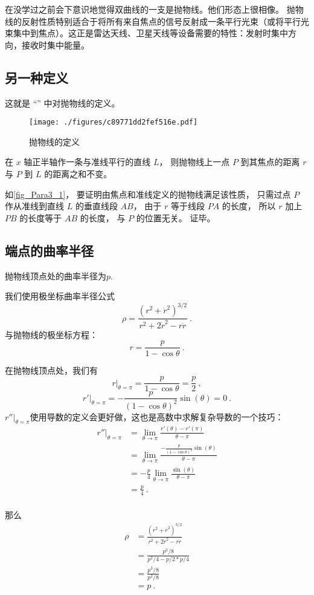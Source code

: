 
\begin{issues}
\issueDraft
\end{issues}


在没学过之前会下意识地觉得双曲线的一支是抛物线。他们形态上很相像。
抛物线的反射性质特别适合于将所有来自焦点的信号反射成一条平行光束（或将平行光束集中到焦点）。这正是雷达天线、卫星天线等设备需要的特性：发射时集中方向，接收时集中能量。

\subsection{另一种定义}
这就是 “” 中对抛物线的定义。
\begin{figure}[ht]
\centering
\texttt{[image: ./figures/c89771dd2fef516e.pdf]}
\caption{抛物线的定义} \label{fig_Para3_1}
\end{figure}

在 $x$ 轴正半轴作一条与准线平行的直线 $L$， 则抛物线上一点 $P$ 到其焦点的距离 $r$ 与 $P$ 到 $L$ 的距离之和不变。

如\autoref{fig_Para3_1}， 要证明由焦点和准线定义的抛物线满足该性质， 只需过点 $P$ 作从准线到直线 $L$ 的垂直线段 $AB$， 由于 $r$ 等于线段 $PA$ 的长度， 所以 $r$ 加上 $PB$ 的长度等于 $AB$ 的长度， 与 $P$ 的位置无关。 证毕。

\subsection{端点的曲率半径}
抛物线顶点处的曲率半径为$p$.

我们使用极坐标曲率半径公式
$$
\rho = \frac{(r^2 + \dot r^2)^{3/2}}{r^2 + 2\dot r^2 - r\ddot r}~.
$$
与抛物线的极坐标方程：
$$
r = \frac{p}{1 - \cos \theta }~.
$$

在抛物线顶点处，我们有
$$
r|_{\theta = \pi} = \frac{p}{1 - \cos \theta} = \frac{p}{2}~,
$$
$$
r' |_{\theta = \pi} = -\frac{p}{(1 - \cos \theta)^2} \sin(\theta) = 0~.
$$
$r'' |_{\theta = \pi}$使用导数的定义会更好做，这也是高数中求解复杂导数的一个技巧：
$$
\begin{aligned}
r''|_{\theta = \pi}  &= \lim_{\theta \to \pi} \frac{r'(\theta) - r'(\pi)}{\theta - \pi}\\
&=\lim_{\theta \to \pi} \frac{-\frac{p}{(1 - \cos \theta)^2} \sin(\theta)}{\theta - \pi}\\
&=-\frac{p}{4} \lim_{\theta \to \pi} \frac{\sin(\theta)}{\theta - \pi}\\
&=\frac{p}{4}~.\\
\end{aligned}
$$

那么
$$
\begin{aligned}
\rho &= \frac{(r^2 + \dot r^2)^{3/2}}{r^2 + 2\dot r^2 - r\ddot r}\\
&=\frac{p^3/8}{p^2/4 - p/2*p/4}\\
&=\frac{p^3/8}{p^2/8}\\
&=p~.\\
\end{aligned}
$$
